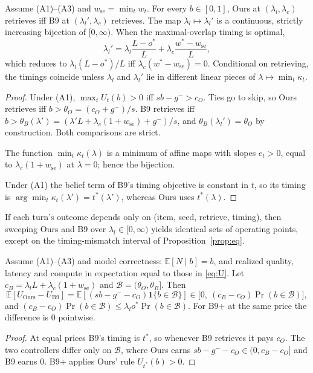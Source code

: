 \begin{proposition}[Equivalence]\label{prop:eq}
Assume (A1)--(A3) and $w_{\mathrm{se}}=\min_tw_t$. For every $b\in[0,1]$, Ours
at $(\lambda_l,\lambda_c)$ retrieves iff B9 at $(\lambda_l',\lambda_c)$
retrieves. The map $\lambda_l\mapsto\lambda_l'$ is a continuous, strictly
increasing bijection of $[0,\infty)$. When the maximal-overlap timing is optimal,
\[
\lambda_l'=\lambda_l\frac{L-o^{*}}{L}+\lambda_c\frac{w^{*}-w_{\mathrm{se}}}{L},
\]
which reduces to $\lambda_l(L-o^{*})/L$ iff $\lambda_c(w^{*}-w_{\mathrm{se}})=0$.
Conditional on retrieving, the timings coincide unless $\lambda_l$ and
$\lambda_l'$ lie in different linear pieces of $\lambda\mapsto\min_t\kappa_t$.
\end{proposition}
\begin{proof}
Under (A1), $\max_tU_t(b)>0$ iff $sb-g^{-}>c_O$. Ties go to skip, so Ours
retrieves iff $b>\theta_O=(c_O+g^{-})/s$. B9 retrieves iff
$b>\theta_B(\lambda')=(\lambda'L+\lambda_c(1+w_{\mathrm{se}})+g^{-})/s$, and
$\theta_B(\lambda_l')=\theta_O$ by construction. Both comparisons are strict.

The function $\min_t\kappa_t(\lambda)$ is a minimum of affine maps with slopes
$e_t>0$, equal to $\lambda_c(1+w_{\mathrm{se}})$ at $\lambda=0$; hence the
bijection.

Under (A1) the belief term of B9's timing objective is constant in $t$, so its
timing is $\arg\min_t\kappa_t(\lambda')=t^{*}(\lambda')$, whereas Ours uses
$t^{*}(\lambda)$.
\end{proof}

\begin{corollary}[Frontiers]
If each turn's outcome depends only on (item, seed, retrieve, timing), then
sweeping Ours and B9 over $\lambda_l\in[0,\infty)$ yields identical sets of
operating points, except on the timing-mismatch interval of
Proposition~\ref{prop:eq}.
\end{corollary}

\begin{proposition}\label{prop:gap}
Assume (A1)--(A3) and model correctness: $\mathbb E[N\mid b]=b$, and realized
quality, latency and compute in expectation equal to those in \eqref{eq:U}.
Let $c_B=\lambda_lL+\lambda_c(1+w_{\mathrm{se}})$ and
$\mathcal B=(\theta_O,\theta_B]$. Then
\[
\mathbb E[U_{\mathrm{Ours}}-U_{\mathrm{B9}}]=\mathbb E[(sb-g^{-}-c_O)\mathbf 1\{b\in\mathcal B\}]
\in\big[0,\ (c_B-c_O)\Pr(b\in\mathcal B)\big],
\]
and $(c_B-c_O)\Pr(b\in\mathcal B)\le\lambda_lo^{*}\Pr(b\in\mathcal B)$.
For B9+ at the same price the difference is $0$ pointwise.
\end{proposition}
\begin{proof}
At equal prices B9's timing is $t^{*}$, so whenever B9 retrieves it pays
$c_O$. The two controllers differ only on $\mathcal B$, where Ours earns
$sb-g^{-}-c_O\in(0,c_B-c_O]$ and B9 earns $0$. B9+ applies Ours' rule
$U_{t^{*}}(b)>0$.
\end{proof}


